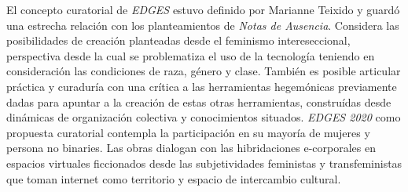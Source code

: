 
El concepto curatorial de \textit{EDGES} estuvo definido por Marianne Teixido y guardó una estrecha relación con los planteamientos de \textit{Notas de Ausencia}. Considera las posibilidades de creación planteadas desde el feminismo intereseccional, perspectiva desde la cual se problematiza el uso de la tecnología teniendo en consideración las condiciones de raza, género y clase. También es posible articular práctica y curaduría con una crítica a las herramientas hegemónicas previamente dadas para apuntar a la creación de estas otras herramientas, construídas desde dinámicas de organización colectiva y conocimientos situados. \textit{EDGES 2020} como propuesta curatorial contempla la participación en su mayoría de mujeres y persona no binaries. Las obras dialogan con las hibridaciones e-corporales en espacios virtuales ficcionados desde las subjetividades feministas y transfeministas que toman internet como territorio y espacio de intercambio cultural.

\iffalse
- Uso de espacios tridimensionales 
- Bots y literatura 
- Datos que transforman el espacio   
- Ensayos digitales en la web
- cyberfeminisimo
- audio virtualmente posicionado 
- streaming de audio y video sin plataformas privativas - decisiones de optimización
- Según yo aquí usamos icecast y liquid soap 
- Inicios de multiplayer
\fi
